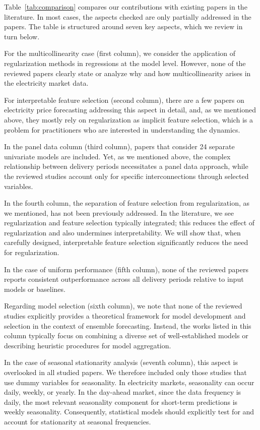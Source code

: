 \documentclass{article}
\begin{document}
Table~\ref{tab:comparison} compares our contributions with existing papers in the literature. In most cases, the aspects checked are only partially addressed in the papers. The table is structured around seven key aspects, which we review in turn below. 

For the multicollinearity case (first column), we consider the application of regularization methods in regressions at the model level. However, none of the reviewed papers clearly state or analyze why and how multicollinearity arises in the electricity market data. 

For interpretable feature selection (second column), there are a few papers on electricity price forecasting addressing this aspect in detail, and, as we mentioned above, they mostly rely on regularization as implicit feature selection, which is a problem for practitioners who are interested in understanding the dynamics. 

In the panel data column (third column), papers that consider 24 separate univariate models are included. Yet, as we mentioned above, the complex relationship between delivery periods necessitates a panel data approach, while the reviewed studies account only for specific interconnections through selected variables. 

In the fourth column, the separation of feature selection from regularization, as we mentioned, has not been previously addressed. In the literature, we see regularization and feature selection typically integrated; this reduces the effect of regularization and also undermines interpretability. We will show that, when carefully designed, interpretable feature selection significantly reduces the need for regularization. 


In the case of uniform performance (fifth column), none of the reviewed papers reports consistent outperformance across all delivery periods relative to input models or baselines. 

Regarding model selection (sixth column), we note that none of the reviewed studies explicitly provides a theoretical framework for model development and selection in the context of ensemble forecasting. Instead, the works listed in this column typically focus on combining a diverse set of well-established models or describing heuristic procedures for model aggregation.

In the case of seasonal stationarity analysis (seventh column), this aspect is overlooked in all studied papers. We therefore included only those studies that use dummy variables for seasonality. In electricity markets, seasonality can occur daily, weekly, or yearly. In the day-ahead market, since the data frequency is daily, the most relevant seasonality component for short-term predictions is weekly seasonality. Consequently, statistical models should explicitly test for and account for stationarity at seasonal frequencies.
\end{document}
